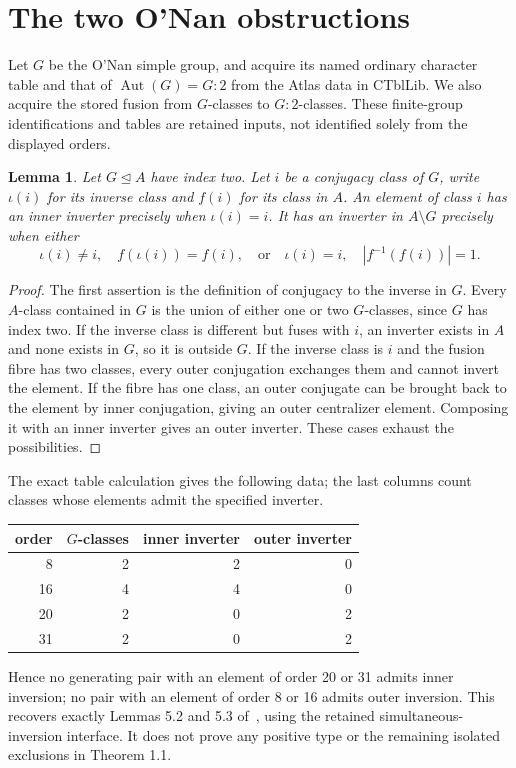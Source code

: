 \documentclass[11pt,a4paper]{article}
\newtheorem{lemma}[theorem]{Lemma}
\newcommand{\Aut}{\operatorname{Aut}}
\begin{document}
\section{The two O'Nan obstructions}
Let $G$ be the O'Nan simple group, and acquire its named ordinary character
table and that of $\Aut(G)=G:2$ from the Atlas data in CTblLib.
We also acquire the stored fusion from $G$-classes to $G:2$-classes.
These finite-group identifications and tables are retained inputs, not
identified solely from the displayed orders.

\begin{lemma}\label{inverse}
Let $G\trianglelefteq A$ have index two. Let $i$ be a conjugacy class of
$G$, write $\iota(i)$ for its inverse class and $f(i)$ for its class in
$A$. An element of class $i$ has an inner inverter precisely when
$\iota(i)=i$. It has an inverter in $A\setminus G$ precisely when either
\[
 \iota(i)\ne i,\quad f(\iota(i))=f(i),
 \quad\text{or}\quad
 \iota(i)=i,\quad |f^{-1}(f(i))|=1.
\]
\end{lemma}
\begin{proof}
The first assertion is the definition of conjugacy to the inverse in $G$.
Every $A$-class contained in $G$ is the union of either one or two
$G$-classes, since $G$ has index two. If the inverse class is different
but fuses with $i$, an inverter exists in $A$ and none exists in $G$,
so it is outside $G$. If the inverse class is $i$ and the fusion fibre
has two classes, every outer conjugation exchanges them and cannot invert
the element. If the fibre has one class, an outer conjugate can be brought
back to the element by inner conjugation, giving an outer centralizer
element. Composing it with an inner inverter gives an outer inverter.
These cases exhaust the possibilities.
\end{proof}

The exact table calculation gives the following data; the last columns
count classes whose elements admit the specified inverter.
\begin{center}\begin{tabular}{rrrr}\toprule
order&$G$-classes&inner inverter&outer inverter\\\midrule
8&2&2&0\\16&4&4&0\\20&2&0&2\\31&2&0&2\\\bottomrule
\end{tabular}\end{center}
Hence no generating pair with an element of order 20 or 31 admits inner
inversion; no pair with an element of order 8 or 16 admits outer inversion.
This recovers exactly Lemmas 5.2 and 5.3 of~\cite{CL}, using the retained
simultaneous-inversion interface. It does not prove any positive type or
the remaining isolated exclusions in Theorem 1.1.
\end{document}
